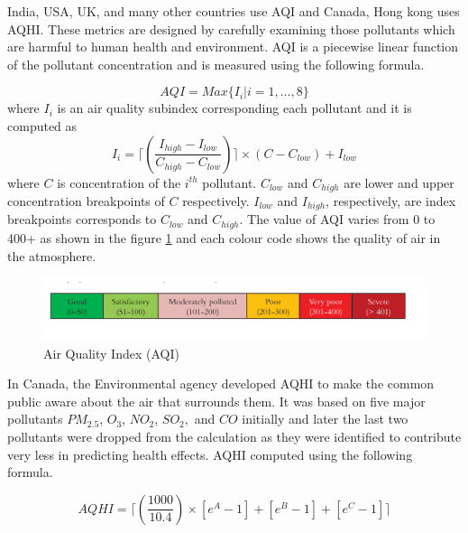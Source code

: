 India, USA, UK, and many other countries use AQI and Canada, Hong kong uses AQHI. These metrics are designed  by carefully examining those pollutants which are harmful to human health and environment.
AQI is a piecewise linear function of the pollutant concentration \cite{Soni2016} and is measured using the following formula.

\begin{equation}
AQI = Max \{I_i|i = 1, ..., 8\}
\end{equation}
where $I_i$ is an air quality subindex corresponding each pollutant and it is computed as 
\begin{equation}
I_i = \lceil(\frac{I_{high} - I_{low}}{C_{high} - C_{low}})\rceil \times (C - C_{low}) + I_{low}
\end{equation}
where $C$ is concentration of the $i^{th}$ pollutant. $C_{low}$ and $C_{high}$ are lower and upper concentration breakpoints of $C$ respectively.
$I_{low}$ and $I_{high}$, respectively, are index breakpoints corresponds to $C_{low}$ and $C_{high}$.  The value of AQI varies from 0 to 400+ as shown in the figure \ref{aqi} and each colour code shows the quality of air in the atmosphere.


\begin{figure}[h]
    \begin{center}
    \includegraphics[scale=0.58]{./images/figure13.png}
    \end{center}
   
    \caption{Air Quality Index (AQI) \cite{AirQualityIndex}}
    
    \label{aqi}
\end{figure}


In Canada, the Environmental agency developed AQHI to make the common public aware about the air that surrounds them. It was based on five major pollutants $PM_{2.5}$, $O_3$, $NO_2$, $SO_2,$ and $CO$ initially and later the last two pollutants were dropped from the calculation as they were identified to  contribute very less in predicting health effects. AQHI computed using the following formula.


\begin{equation}
AQHI = \lceil (\frac{1000}{10.4}) \times [e^A-1]+[e^B-1]+[e^C-1] \rceil
\end{equation}

